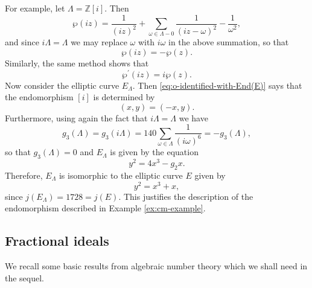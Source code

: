 For example, let $\Lambda = \mathbb{Z}[i]$.  Then
\begin{equation*}
  \wp(iz) = \frac{1}{(iz)^{2}} + \sum_{\omega \in \Lambda - 0}\frac{1}{(iz - \omega)^{2}} - \frac{1}{\omega^{2}},
\end{equation*}
and since $i\Lambda = \Lambda$ we may replace $\omega$ with $i \omega$ in the above
summation, so that
\begin{equation*}
  \wp(iz) = -\wp(z).
\end{equation*}
Similarly, the same method shows that
\begin{equation*}
  \wp^{\prime}(iz) = i\wp(z).
\end{equation*}
Now consider the elliptic curve $E_{\Lambda}$.  Then
\eqref{eq:o-identified-with-End(E)} says that the endomorphism $[i]$ is determined by
\begin{equation*}
  [i](x,y) = (-x,y).
\end{equation*}
Furthermore, using again the fact that $i\Lambda = \Lambda$ we have
\begin{equation*}
  g_{3}(\Lambda) = g_{3}(i\Lambda) = 140 \sum_{\omega \in \Lambda} \frac{1}{(i
    \omega)^{6}} = -g_{3}(\Lambda),
\end{equation*}
so that $g_{3}(\Lambda) = 0$ and $E_{\Lambda}$ is given by the equation
\begin{equation*}
  y^{2} = 4x^{3} - g_{2}x.
\end{equation*}
Therefore, $E_{\Lambda}$ is isomorphic to the elliptic curve $E$ given by
\begin{equation*}
  y^{2} = x^{3} + x,
\end{equation*}
since $j(E_{\Lambda}) = 1728 = j(E)$.  This justifies the description of the
endomorphism described in Example \ref{ex:cm-example}.

\subsection{Fractional ideals}
\label{sec:fractional-ideals}

We recall some basic results from algebraic number theory which we shall need in the
sequel.

